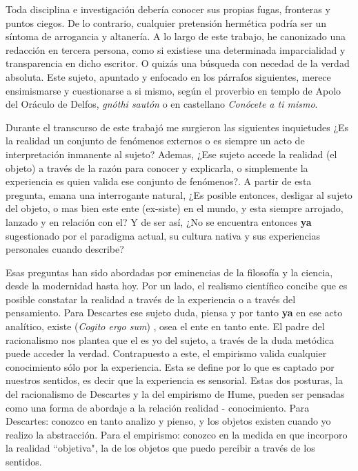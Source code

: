 Toda disciplina e investigación debería conocer sus propias fugas, fronteras y puntos ciegos. De lo contrario, cualquier pretensión hermética podría ser un síntoma de arrogancia y altanería.  A lo largo de este trabajo, he canonizado una redacción en tercera persona, como si existiese una determinada imparcialidad y transparencia en dicho escritor. O quizás una búsqueda con necedad de la verdad absoluta. Este sujeto, apuntado y enfocado en los párrafos siguientes, merece ensimismarse y cuestionarse a si mismo, según el proverbio en templo de Apolo del Oráculo de Delfos, \emph{gnóthi sautón} o en castellano \emph{Conócete a ti mismo}.

Durante el transcurso de este trabajó me surgieron las siguientes inquietudes ¿Es la realidad un conjunto de fenómenos externos o es siempre un acto de interpretación inmanente al sujeto? Ademas, ¿Ese sujeto accede la realidad (el objeto) a través de la razón para conocer y explicarla, o simplemente la experiencia es quien valida ese conjunto de fenómenos?. A partir de esta pregunta, emana una interrogante natural, ¿Es posible entonces, desligar al sujeto del objeto, o mas bien este ente (ex-siste) en el mundo, y esta siempre arrojado, lanzado y en relación con el? Y de ser así, ¿No se encuentra entonces \textbf{ya} sugestionado por el paradigma actual, su cultura nativa y sus experiencias personales cuando describe?

 Esas preguntas han sido abordadas por eminencias de la filosofía y la ciencia, desde la modernidad hasta hoy. Por un lado, el realismo científico concibe que es posible constatar la realidad a través de la experiencia o a través del pensamiento. Para Descartes ese sujeto duda, piensa y por tanto \textbf{ya} en ese acto analítico, existe (\emph{Cogito ergo sum}) \cite{descartes2004discurso}, osea el ente en tanto ente. El padre del racionalismo nos plantea que el es yo del sujeto, a través de la duda metódica puede acceder la verdad. Contrapuesto a este, el empirismo valida cualquier conocimiento sólo por la experiencia. Esta se define por lo que es captado por nuestros sentidos, es decir que la experiencia es sensorial. Estas dos posturas, la del racionalismo de Descartes y la del empirismo de Hume, pueden ser pensadas como una forma de abordaje a la relación realidad - conocimiento. Para Descartes: conozco en tanto analizo y pienso, y los objetos existen cuando yo realizo la abstracción. Para el empirismo: conozco en la medida en que incorporo la realidad ``objetiva", la de los objetos que puedo percibir a través de los sentidos. 

